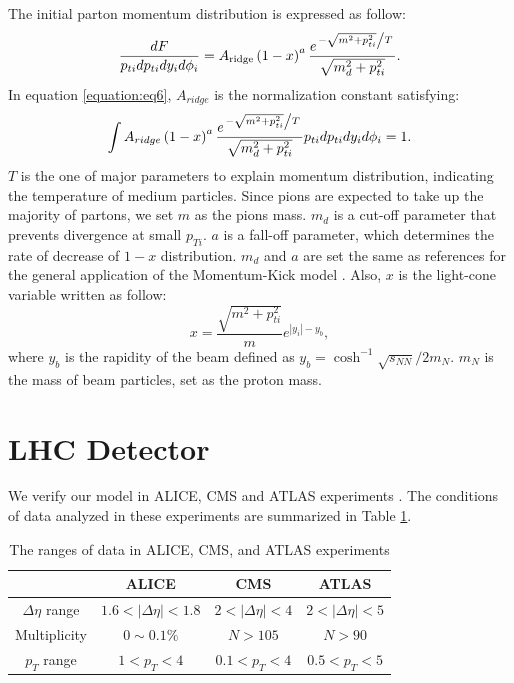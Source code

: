 \documentclass[12pt]{article}
\begin{document}
The initial parton momentum distribution is expressed as follow:
\begin{equation} \label{equation:eq6}
\frac{dF}{p_{ti}dp_{ti}dy_id\phi_i}=A_{\text{ridge}}\left(1-x\right)^a\frac{e^{ \left. -\sqrt{m^2+p_{ti}^2} \middle/ T \right. }}{\sqrt{m_d^2+p_{ti}^2}}.
\end{equation}
In equation \ref{equation:eq6}, $A_{ridge}$ is the normalization constant satisfying:
\begin{equation} \label{equation:eq7}
\int{A_{ridge}\left(1-x\right)^a\frac{e^{ \left. -\sqrt{m^2+p_{ti}^2} \middle/ T \right. }}{\sqrt{m_d^2+p_{ti}^2}}}p_{ti}dp_{ti}dy_id\phi_i=1.
\end{equation}
$T$ is the one of major parameters to explain momentum distribution, indicating the temperature of medium particles.
Since pions are expected to take up the majority of partons, we set $m$ as the pions mass.
$m_d$ is a cut-off parameter that prevents divergence at small $p_{Ti}$.
$a$ is a fall-off parameter, which determines the rate of decrease of $1-x$ distribution.
$m_d$ and $a$ are set the same as references \cite{PbPb, Wong_1} for the general application of the Momentum-Kick model \cite{Wong_1}.
Also, $x$ is the light-cone variable written as follow:
\begin{equation} \label{equation:eq8}
x=\frac{\sqrt{m^2+p_{ti}^2}}{m}e^{\left|y_i\right|-y_b},
\end{equation}
where $y_b$ is the rapidity of the beam defined as $y_b=\cosh^{-1}{\sqrt{s_{NN}}/2m_N}$. $m_N$ is the mass of beam particles, set as the proton mass.


\section*{LHC Detector}

We verify our model in ALICE, CMS and ATLAS experiments \cite{alice,cms,atlas}. The conditions of data analyzed in these experiments are summarized in Table \ref{table:range}.

\begin{table}[h!]
  \centering
  \begin{tabular}{||c c c c||} 
   \hline
   & ALICE & CMS & ATLAS \\ [0.5ex] 
  \hline\hline
  $\Delta \eta $ range & $1.6<|\Delta \eta |<1.8$ & $2<|\Delta \eta |<4$ & $2<|\Delta \eta |<5$ \\ 
  Multiplicity & $0\sim0.1\%$ & $N>105$ & $N>90$ \\
  $p_T$ range & $1<p_T<4$ & $0.1<p_T<4$ & $0.5<p_T<5$ \\[1ex]
  \hline
 \end{tabular}
 \caption{The ranges of data in ALICE, CMS, and ATLAS experiments \cite{alice, cms, atlas}}
 \label{table:range}
\end{table}
\end{document}
